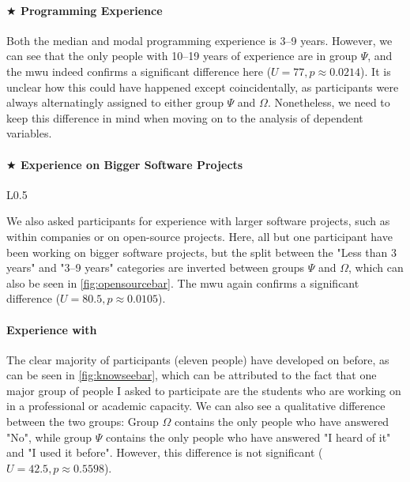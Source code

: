 \documentclass[../thesis]{subfiles}
\begin{document}
\paragraph{$\bigstar$ Programming Experience}
Both the median and modal programming experience is 3--9 years.
However, we can see that the only people with 10--19 years of experience are in group $\Psi$, and the \gls{mwu} indeed confirms a significant difference here ($U = 77, p \approx 0.0214$).
It is unclear how this could have happened except coincidentally, as participants were always alternatingly assigned to either group $\Psi$ and $\Omega$.
Nonetheless, we need to keep this difference in mind when moving on to the analysis of dependent variables.

\paragraph{$\bigstar$ Experience on Bigger Software Projects}

\begin{wrapfigure}{L}{0.5\textwidth}
	\centering
	\caption{"How long have you been programming on bigger software projects (\eg, within a company, or open-source projects)?"}\label{fig:opensourcebar}
\end{wrapfigure}

We also asked participants for experience with larger software projects, such as within companies or on open-source projects.
Here, all but one participant have been working on bigger software projects, but the split between the "Less than 3 years" and "3--9 years" categories are inverted between groups $\Psi$ and $\Omega$, which can also be seen in \cref{fig:opensourcebar}.
The \gls{mwu} again confirms a significant difference ($U = 80.5, p \approx 0.0105$).

\paragraph{Experience with \SEE{}}
The clear majority of participants (eleven people) have developed on \SEE{} before, as can be seen in \cref{fig:knowseebar}, which can be attributed to the fact that one major group of people I asked to participate are the students who are working on \SEE{} in a professional or academic capacity.
We can also see a qualitative difference between the two groups:
Group $\Omega$ contains the only people who have answered "No", while group $\Psi$ contains the only people who have answered "I heard of it" and "I used it before".
However, this difference is not significant ($U = 42.5, p \approx 0.5598$).
\end{document}
